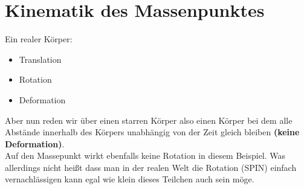 \documentclass[11pt]{article}
\begin{document}
	\section{Kinematik des Massenpunktes}
	Ein realer Körper:
	\begin{itemize}
		\item Translation
		\item Rotation
		\item Deformation
	\end{itemize}
	Aber nun reden wir über einen starren Körper also einen Körper bei dem alle Abstände innerhalb des Körpers unabhängig von der Zeit gleich bleiben \textbf{(keine Deformation)}.\\
	Auf den Massepunkt wirkt ebenfalls keine Rotation in diesem Beispiel. Was allerdings nicht heißt dass man in der realen Welt die Rotation (SPIN) einfach vernachlässigen kann egal wie klein dieses Teilchen auch sein möge.\\
\end{document}
